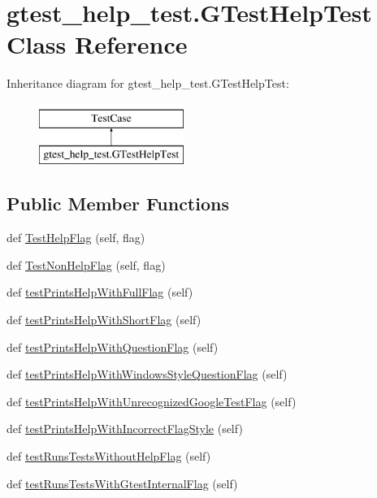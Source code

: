 \hypertarget{classgtest__help__test_1_1GTestHelpTest}{}\section{gtest\+\_\+help\+\_\+test.\+G\+Test\+Help\+Test Class Reference}
\label{classgtest__help__test_1_1GTestHelpTest}
Inheritance diagram for gtest\+\_\+help\+\_\+test.\+G\+Test\+Help\+Test\+:\begin{figure}[H]
\begin{center}
\leavevmode
\includegraphics[height=2.000000cm]{classgtest__help__test_1_1GTestHelpTest}
\end{center}
\end{figure}
\subsection*{Public Member Functions}
\begin{DoxyCompactItemize}
\item 
def \mbox{\hyperlink{classgtest__help__test_1_1GTestHelpTest_a26cc1a64bd67278252ebfcd0ac0dca0c}{Test\+Help\+Flag}} (self, flag)
\item 
def \mbox{\hyperlink{classgtest__help__test_1_1GTestHelpTest_a03ffa91ecf6193ed2ed80b53933112ab}{Test\+Non\+Help\+Flag}} (self, flag)
\item 
def \mbox{\hyperlink{classgtest__help__test_1_1GTestHelpTest_ad91b46ad4506ff52b337b63f6b6c2ad1}{test\+Prints\+Help\+With\+Full\+Flag}} (self)
\item 
def \mbox{\hyperlink{classgtest__help__test_1_1GTestHelpTest_a3dd96058d093a89350769b4e2cc36563}{test\+Prints\+Help\+With\+Short\+Flag}} (self)
\item 
def \mbox{\hyperlink{classgtest__help__test_1_1GTestHelpTest_aafd4d1857c2538c8b1f7cc5a5d1e38b4}{test\+Prints\+Help\+With\+Question\+Flag}} (self)
\item 
def \mbox{\hyperlink{classgtest__help__test_1_1GTestHelpTest_a7be99cd30193e2eecf79f9d65f561afc}{test\+Prints\+Help\+With\+Windows\+Style\+Question\+Flag}} (self)
\item 
def \mbox{\hyperlink{classgtest__help__test_1_1GTestHelpTest_a701abb8f34df726b9129d7654cb32066}{test\+Prints\+Help\+With\+Unrecognized\+Google\+Test\+Flag}} (self)
\item 
def \mbox{\hyperlink{classgtest__help__test_1_1GTestHelpTest_ab8d379bbb0da7403ced599f4ee498728}{test\+Prints\+Help\+With\+Incorrect\+Flag\+Style}} (self)
\item 
def \mbox{\hyperlink{classgtest__help__test_1_1GTestHelpTest_ae7831f92e8e3763c07afb908915b3d20}{test\+Runs\+Tests\+Without\+Help\+Flag}} (self)
\item 
def \mbox{\hyperlink{classgtest__help__test_1_1GTestHelpTest_a0ebec2e3154d22a63e362d2196f9c638}{test\+Runs\+Tests\+With\+Gtest\+Internal\+Flag}} (self)
\end{DoxyCompactItemize}


